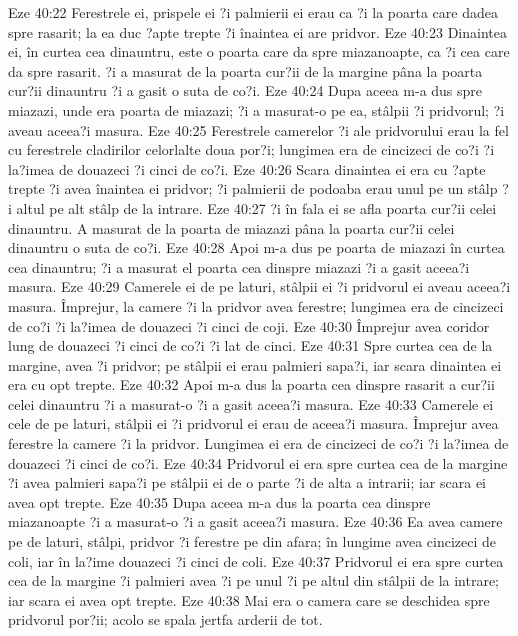 Eze 40:22  Ferestrele ei, prispele ei ?i palmierii ei erau ca ?i la poarta care dadea spre rasarit; la ea duc ?apte trepte ?i înaintea ei are pridvor.
Eze 40:23  Dinaintea ei, în curtea cea dinauntru, este o poarta care da spre miazanoapte, ca ?i cea care da spre rasarit. ?i a masurat de la poarta cur?ii de la margine pâna la poarta cur?ii dinauntru ?i a gasit o suta de co?i.
Eze 40:24  Dupa aceea m-a dus spre miazazi, unde era poarta de miazazi; ?i a masurat-o pe ea, stâlpii ?i pridvorul; ?i aveau aceea?i masura.
Eze 40:25  Ferestrele camerelor ?i ale pridvorului erau la fel cu ferestrele cladirilor celorlalte doua por?i; lungimea era de cincizeci de co?i ?i la?imea de douazeci ?i cinci de co?i.
Eze 40:26  Scara dinaintea ei era cu ?apte trepte ?i avea înaintea ei pridvor; ?i palmierii de podoaba erau unul pe un stâlp ?i altul pe alt stâlp de la intrare.
Eze 40:27  ?i în fala ei se afla poarta cur?ii celei dinauntru. A masurat de la poarta de miazazi pâna la poarta cur?ii celei dinauntru o suta de co?i.
Eze 40:28  Apoi m-a dus pe poarta de miazazi în curtea cea dinauntru; ?i a masurat el poarta cea dinspre miazazi ?i a gasit aceea?i masura.
Eze 40:29  Camerele ei de pe laturi, stâlpii ei ?i pridvorul ei aveau aceea?i masura. Împrejur, la camere ?i la pridvor avea ferestre; lungimea era de cincizeci de co?i ?i la?imea de douazeci ?i cinci de coji.
Eze 40:30  Împrejur avea coridor lung de douazeci ?i cinci de co?i ?i lat de cinci.
Eze 40:31  Spre curtea cea de la margine, avea ?i pridvor; pe stâlpii ei erau palmieri sapa?i, iar scara dinaintea ei era cu opt trepte.
Eze 40:32  Apoi m-a dus la poarta cea dinspre rasarit a cur?ii celei dinauntru ?i a masurat-o ?i a gasit aceea?i masura.
Eze 40:33  Camerele ei cele de pe laturi, stâlpii ei ?i pridvorul ei erau de aceea?i masura. Împrejur avea ferestre la camere ?i la pridvor. Lungimea ei era de cincizeci de co?i ?i la?imea de douazeci ?i cinci de co?i.
Eze 40:34  Pridvorul ei era spre curtea cea de la margine ?i avea palmieri sapa?i pe stâlpii ei de o parte ?i de alta a intrarii; iar scara ei avea opt trepte.
Eze 40:35  Dupa aceea m-a dus la poarta cea dinspre miazanoapte ?i a masurat-o ?i a gasit aceea?i masura.
Eze 40:36  Ea avea camere pe de laturi, stâlpi, pridvor ?i ferestre pe din afara; în lungime avea cincizeci de coli, iar în la?ime douazeci ?i cinci de coli.
Eze 40:37  Pridvorul ei era spre curtea cea de la margine ?i palmieri avea ?i pe unul ?i pe altul din stâlpii de la intrare; iar scara ei avea opt trepte.
Eze 40:38  Mai era o camera care se deschidea spre pridvorul por?ii; acolo se spala jertfa arderii de tot.
